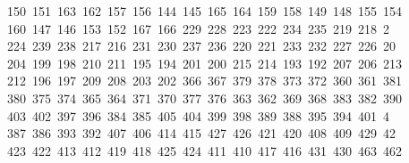 \begin{tabbing}
\>\ 150\ 151\ 163\ 162\ 157\ 156\ 144\ 145\ 165\ 164\ 159\ 158\ 149\ 148\ 155\ 154\ \\[0pt]
\ 160\ 147\ 146\ 153\ 152\ 167\ 166\ 229\ 228\ 223\ 222\ 234\ 235\ 219\ 218\ 2\\[0pt]
\ 224\ 239\ 238\ 217\ 216\ 231\ 230\ 237\ 236\ 220\ 221\ 233\ 232\ 227\ 226\ 20\\[0pt]
\ 204\ 199\ 198\ 210\ 211\ 195\ 194\ 201\ 200\ 215\ 214\ 193\ 192\ 207\ 206\ 213\\[0pt]
\>\ 212\ 196\ 197\ 209\ 208\ 203\ 202\ 366\ 367\ 379\ 378\ 373\ 372\ 360\ 361\ 381\\[0pt]
\>\ 380\ 375\ 374\ 365\ 364\ 371\ 370\ 377\ 376\ 363\ 362\ 369\ 368\ 383\ 382\ 390\ \\[0pt]
\ 403\ 402\ 397\ 396\ 384\ 385\ 405\ 404\ 399\ 398\ 389\ 388\ 395\ 394\ 401\ 4\\[0pt]
\ 387\ 386\ 393\ 392\ 407\ 406\ 414\ 415\ 427\ 426\ 421\ 420\ 408\ 409\ 429\ 42\\[0pt]
\ 423\ 422\ 413\ 412\ 419\ 418\ 425\ 424\ 411\ 410\ 417\ 416\ 431\ 430\ 463\ 462\\[0pt]

\end{tabbing}
